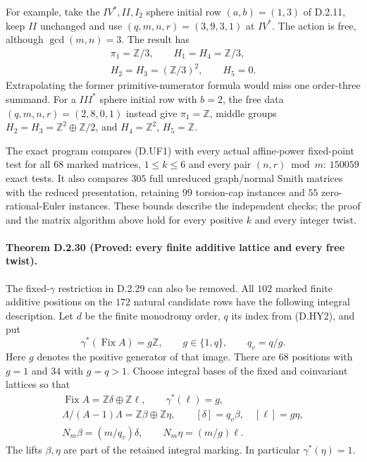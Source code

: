 For example, take the $IV^*,II,I_2$ sphere initial row
$(a,b)=(1,3)$ of D.2.11, keep $II$ unchanged and use
$(q,m,n,r)=(3,9,3,1)$ at $IV^*$. The action is free, although
$\gcd(m,n)=3$. The result has
\[
\begin{gathered}
 \pi_1=\mathbb Z/3,\qquad H_1=H_4=\mathbb Z/3,\\
 H_2=H_3=(\mathbb Z/3)^2,\qquad H_5=0.
\end{gathered}
\]
Extrapolating the former primitive-numerator formula would
miss one order-three summand. For a $III^*$ sphere initial
row with $b=2$, the free data $(q,m,n,r)=(2,8,0,1)$ instead
give $\pi_1=\mathbb Z$, middle groups
$H_2=H_3=\mathbb Z^2\oplus\mathbb Z/2$, and
$H_4=\mathbb Z^2$, $H_5=\mathbb Z$.

The exact program
 compares
(D.UF1) with every actual affine-power fixed-point test for
all $68$ marked matrices, $1\le k\le6$ and every pair
$(n,r)\bmod m$: $150059$ exact tests. It also compares $305$
full unreduced graph/normal Smith matrices with the reduced
presentation, retaining $99$ torsion-cap instances and $55$
zero-rational-Euler instances. These bounds describe the
independent checks; the proof and the matrix algorithm above
hold for every positive $k$ and every integer twist.


\paragraph{Theorem D.2.30 (Proved: every finite additive lattice and every free twist).}
The fixed-$\gamma$ restriction in D.2.29 can also be removed.
All $102$ marked finite additive positions on the $172$ natural
candidate rows have the following integral description.
Let $d$ be the finite monodromy order, $q$ its index from
(D.HY2), and put
\[
 \gamma^*(\operatorname{Fix}A)=g\mathbb Z,\qquad
 g\in\{1,q\},\qquad q_v=q/g.
                                                               \tag{D.AF1}
\]
Here $g$ denotes the positive generator of that image.
There are $68$ positions with $g=1$ and $34$ with $g=q>1$.
Choose integral bases of the fixed and coinvariant lattices
so that
\[
\begin{gathered}
 \operatorname{Fix}A=\mathbb Z\delta\oplus\mathbb Z\ell,
 \qquad \gamma^*(\ell)=g,\\
 \Lambda/(A-1)\Lambda=\mathbb Z\beta\oplus\mathbb Z\eta,
 \qquad [\delta]=q_v\beta,\quad [\ell]=g\eta,\\
 N_m\beta=(m/q_v)\delta,
 \qquad N_m\eta=(m/g)\ell.
\end{gathered}                                                \tag{D.AF2}
\]
The lifts $\beta,\eta$ are part of the retained integral
marking. In particular $\gamma^*(\eta)=1$.

